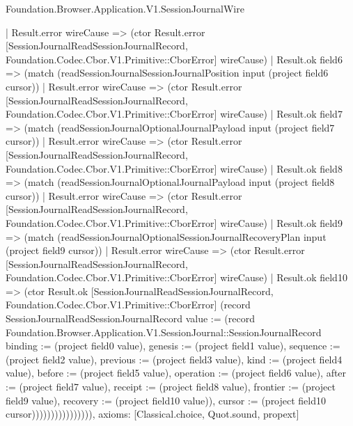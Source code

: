 \begin{lexlean}{Foundation.Browser.Application.V1.SessionJournalWire}
\begin{semanticmodule}
{                    | Result.error wireCause => (ctor Result.error [SessionJournalReadSessionJournalRecord, Foundation.Codec.Cbor.V1.Primitive::CborError] wireCause)
                    | Result.ok field6 => (match (readSessionJournalSessionJournalPosition input (project field6 cursor))
                      | Result.error wireCause => (ctor Result.error [SessionJournalReadSessionJournalRecord, Foundation.Codec.Cbor.V1.Primitive::CborError] wireCause)
                      | Result.ok field7 => (match (readSessionJournalOptionalJournalPayload input (project field7 cursor))
                        | Result.error wireCause => (ctor Result.error [SessionJournalReadSessionJournalRecord, Foundation.Codec.Cbor.V1.Primitive::CborError] wireCause)
                        | Result.ok field8 => (match (readSessionJournalOptionalJournalPayload input (project field8 cursor))
                          | Result.error wireCause => (ctor Result.error [SessionJournalReadSessionJournalRecord, Foundation.Codec.Cbor.V1.Primitive::CborError] wireCause)
                          | Result.ok field9 => (match (readSessionJournalOptionalSessionJournalRecoveryPlan input (project field9 cursor))
                            | Result.error wireCause => (ctor Result.error [SessionJournalReadSessionJournalRecord, Foundation.Codec.Cbor.V1.Primitive::CborError] wireCause)
                            | Result.ok field10 => (ctor Result.ok [SessionJournalReadSessionJournalRecord, Foundation.Codec.Cbor.V1.Primitive::CborError] (record SessionJournalReadSessionJournalRecord {value := (record Foundation.Browser.Application.V1.SessionJournal::SessionJournalRecord {binding := (project field0 value), genesis := (project field1 value), sequence := (project field2 value), previous := (project field3 value), kind := (project field4 value), before := (project field5 value), operation := (project field6 value), after := (project field7 value), receipt := (project field8 value), frontier := (project field9 value), recovery := (project field10 value)}), cursor := (project field10 cursor)}))))))))))))))),
  axioms: [Classical.choice, Quot.sound, propext]
}


\end{semanticmodule}
\end{lexlean}
